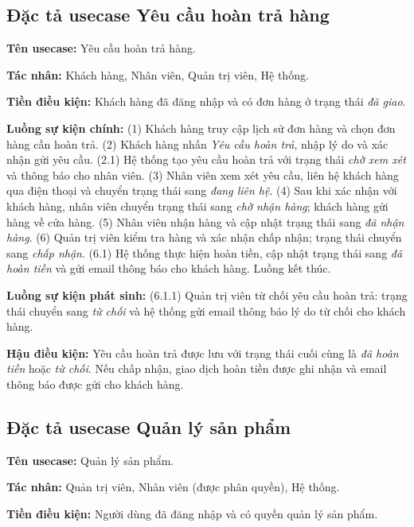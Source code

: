 \documentclass[../DoAn.tex]{subfiles}
\begin{document}
  \subsection{Đặc tả usecase Yêu cầu hoàn trả hàng}
  \label{subsection:2.3.2}
  \hfill

  \textbf{Tên usecase:} Yêu cầu hoàn trả hàng.

  \textbf{Tác nhân:} Khách hàng, Nhân viên, Quản trị viên, Hệ thống.

  \textbf{Tiền điều kiện:} Khách hàng đã đăng nhập và có đơn hàng ở trạng thái
  \textit{đã giao}.

  \textbf{Luồng sự kiện chính:}
  (1) Khách hàng truy cập lịch sử đơn hàng và chọn đơn hàng cần hoàn trả.
  (2) Khách hàng nhấn \textit{Yêu cầu hoàn trả}, nhập lý do và xác nhận gửi yêu cầu.
  (2.1) Hệ thống tạo yêu cầu hoàn trả với trạng thái \textit{chờ xem xét} và
  thông báo cho nhân viên.
  (3) Nhân viên xem xét yêu cầu, liên hệ khách hàng qua điện thoại và chuyển
  trạng thái sang \textit{đang liên hệ}.
  (4) Sau khi xác nhận với khách hàng, nhân viên chuyển trạng thái sang \textit{chờ
  nhận hàng}; khách hàng gửi hàng về cửa hàng.
  (5) Nhân viên nhận hàng và cập nhật trạng thái sang \textit{đã nhận hàng}.
  (6) Quản trị viên kiểm tra hàng và xác nhận chấp nhận; trạng thái chuyển sang
  \textit{chấp nhận}.
  (6.1) Hệ thống thực hiện hoàn tiền, cập nhật trạng thái sang \textit{đã hoàn
  tiền} và gửi email thông báo cho khách hàng. Luồng kết thúc.

  \textbf{Luồng sự kiện phát sinh:}
  (6.1.1) Quản trị viên từ chối yêu cầu hoàn trả: trạng thái chuyển sang
  \textit{từ chối} và hệ thống gửi email thông báo lý do từ chối cho khách hàng.

  \textbf{Hậu điều kiện:} Yêu cầu hoàn trả được lưu với trạng thái cuối cùng là
  \textit{đã hoàn tiền} hoặc \textit{từ chối}. Nếu chấp nhận, giao dịch hoàn tiền
  được ghi nhận và email thông báo được gửi cho khách hàng.

  \subsection{Đặc tả usecase Quản lý sản phẩm}
  \label{subsection:2.3.3}
  \hfill

  \textbf{Tên usecase:} Quản lý sản phẩm.

  \textbf{Tác nhân:} Quản trị viên, Nhân viên (được phân quyền), Hệ thống.

  \textbf{Tiền điều kiện:} Người dùng đã đăng nhập và có quyền quản lý sản phẩm.
\end{document}
